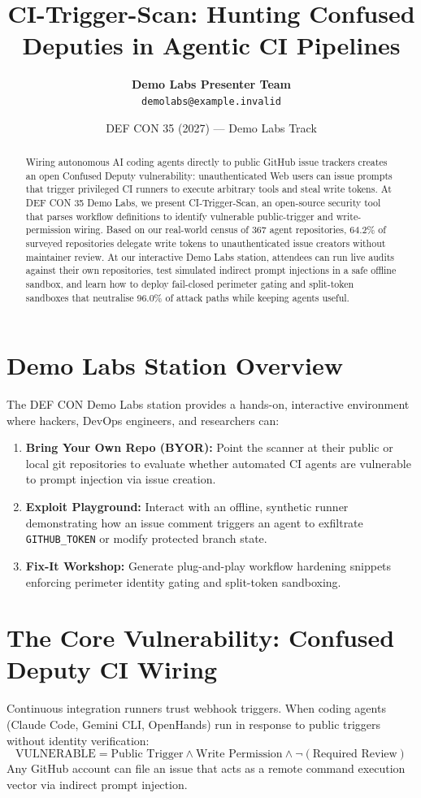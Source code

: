 \documentclass[11pt,a4paper]{article}
\title{\textbf{CI-Trigger-Scan: Hunting Confused Deputies in Agentic CI Pipelines}}
\author{
  \textbf{Demo Labs Presenter Team}\\
  \texttt{demolabs@example.invalid}
}
\date{DEF CON 35 (2027) --- Demo Labs Track}
\begin{document}
\maketitle

\begin{abstract}
Wiring autonomous AI coding agents directly to public GitHub issue trackers creates an open Confused Deputy vulnerability: unauthenticated Web users can issue prompts that trigger privileged CI runners to execute arbitrary tools and steal write tokens. At DEF CON 35 Demo Labs, we present CI-Trigger-Scan, an open-source security tool that parses workflow definitions to identify vulnerable public-trigger and write-permission wiring. Based on our real-world census of 367 agent repositories, 64.2\% of surveyed repositories delegate write tokens to unauthenticated issue creators without maintainer review. At our interactive Demo Labs station, attendees can run live audits against their own repositories, test simulated indirect prompt injections in a safe offline sandbox, and learn how to deploy fail-closed perimeter gating and split-token sandboxes that neutralise 96.0\% of attack paths while keeping agents useful.
\end{abstract}

\section{Demo Labs Station Overview}
The DEF CON Demo Labs station provides a hands-on, interactive environment where hackers, DevOps engineers, and researchers can:
\begin{enumerate}
    \item \textbf{Bring Your Own Repo (BYOR):} Point the scanner at their public or local git repositories to evaluate whether automated CI agents are vulnerable to prompt injection via issue creation.
    \item \textbf{Exploit Playground:} Interact with an offline, synthetic runner demonstrating how an issue comment triggers an agent to exfiltrate \texttt{GITHUB\_TOKEN} or modify protected branch state.
    \item \textbf{Fix-It Workshop:} Generate plug-and-play workflow hardening snippets enforcing perimeter identity gating and split-token sandboxing.
\end{enumerate}

\section{The Core Vulnerability: Confused Deputy CI Wiring}
Continuous integration runners trust webhook triggers. When coding agents (Claude Code, Gemini CLI, OpenHands) run in response to public triggers without identity verification:
\begin{equation}
\text{VULNERABLE} = \text{Public Trigger} \land \text{Write Permission} \land \neg(\text{Required Review})
\end{equation}
Any GitHub account can file an issue that acts as a remote command execution vector via indirect prompt injection.
\end{document}
